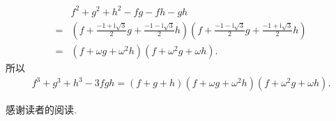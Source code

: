 \begin{example}
\begin{align*}
             & f^2 + g^2 + h^2 - fg - fh - gh                                                                                                                                                                \\
        = {} & \left( f + \frac{-1 + \mathrm{i} \sqrt{3}}{2} g + \frac{-1 - \mathrm{i} \sqrt{3}}{2} h \right) \left( f + \frac{-1 - \mathrm{i} \sqrt{3}}{2} g + \frac{-1 + \mathrm{i} \sqrt{3}}{2} h \right) \\
        = {} & (f + \omega g + \omega^2 h) (f + \omega^2 g + \omega h).
    \end{align*}
    所以
    \begin{align*}
        f^3 + g^3 + h^3 - 3fgh = (f + g + h) (f + \omega g + \omega^2 h) (f + \omega^2 g + \omega h).
    \end{align*}
\end{example}

感谢读者的阅读.
